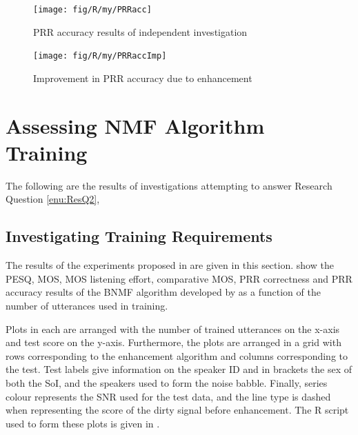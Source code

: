 \begin{figure}[h]
\noindent \begin{centering}
\texttt{[image: fig/R/my/PRRacc]}
\par\end{centering}

\protect\caption{\label{fig:my-PRRacc}\acs{PRR} accuracy results of independent investigation}
\end{figure}


\begin{figure}[h]
\noindent \begin{centering}
\texttt{[image: fig/R/my/PRRaccImp]}
\par\end{centering}

\protect\caption{\label{fig:my-PRRacc-imp}Improvement in \acs{PRR} accuracy due to
enhancement}
\end{figure}


\clearpage{}


\section{Assessing \acl{NMF} Algorithm Training}

The following are the results of investigations attempting to answer
Research Question \ref{enu:ResQ2}, \textit{\RQtwo{}}


\subsection{Investigating Training Requirements}

The results of the experiments proposed in 
are given in this section. 
show the \ac{PESQ}, \ac{MOS}, \ac{MOS} listening effort, comparative
\ac{MOS}, \ac{PRR} correctness and \ac{PRR} accuracy results of
the \ac{BNMF} algorithm developed by \citet{mohammadiha2013supervised}
as a function of the number of utterances used in training.

Plots in 
each are arranged with the number of trained utterances on the x-axis
and test score on the y-axis. Furthermore, the plots are arranged
in a grid with rows corresponding to the enhancement algorithm and
columns corresponding to the test. Test labels give information on
the speaker ID and in brackets the sex of both the SoI, and the speakers
used to form the noise babble. Finally, series colour represents the
\ac{SNR} used for the test data, and the line type is dashed when
representing the score of the dirty signal before enhancement. The
R script used to form these plots is given in .


